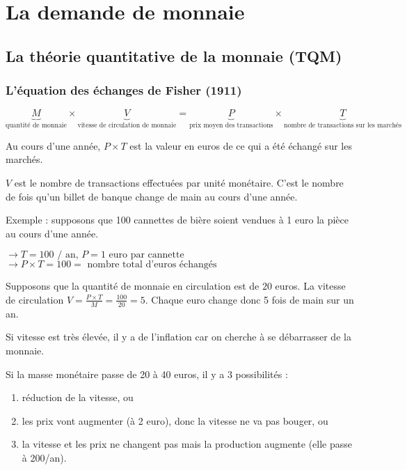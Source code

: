 \chapter{La demande de monnaie}

\section{La théorie quantitative de la monnaie (TQM)}

	\subsection{L'équation des échanges de Fisher (1911)}
	
	$$\underbrace{M}_{\text{quantité de monnaie}} \times \underbrace{V}_{\text{vitesse de circulation de monnaie}} = \underbrace{P}_{\text{prix moyen des transactions}} \times \underbrace{T}_{\text{nombre de transactions sur les marchés}}$$
	
	Au cours d'une année, $P \times T$ est la valeur en euros de ce qui a été échangé sur les marchés.
	
	$V$ est le nombre de transactions effectuées par unité monétaire. C'est le nombre de fois qu'un billet de banque change de main au cours d'une année.
	
	Exemple : supposons que 100 cannettes de bière soient vendues à 1 euro la pièce au cours d'une année.
	
	$\rightarrow T = 100\text{ / an, } P = 1 \text{ euro par cannette}$
	$\rightarrow P \times T = 100 = \text{ nombre total d'euros échangés}$
	
	Supposons que la quantité de monnaie en circulation est de $20$ euros. La vitesse de circulation $V = \frac{P \times T}{M} = \frac{100}{20} = 5$. Chaque euro change donc 5 fois de main sur un an.
	
	Si vitesse est très élevée, il y a de l'inflation car on cherche à se débarrasser de la monnaie.
	
	Si la masse monétaire passe de 20 à 40 euros, il y a 3 possibilités :
	
	\begin{enumerate}
		\item réduction de la vitesse, ou
		\item les prix vont augmenter (à 2 euro), donc la vitesse ne va pas bouger, ou
		\item la vitesse et les prix ne changent pas mais la production augmente (elle passe à 200/an).
	\end{enumerate}
	
